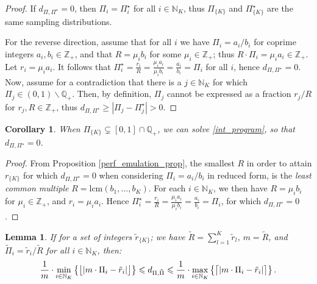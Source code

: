 \documentclass[journal,letterpaper,onecolumn,twoside,nofonttune]{IEEEtran}
\newcommand{\N}{\mathbb{N}}
\newcommand{\Z}{\mathbb{Z}}
\newcommand{\Q}{\mathbb{Q}}
\newcommand{\Rt}{\tilde{R}}
\newcommand{\rt}{\tilde{r}}
\newcommand{\Pis}{\Pi^{\star}}
\newcommand{\Pit}{\tilde{\Pi}}
\newcommand{\lcm}{\mathrm{lcm}}
\DeclarePairedDelimiter\bceil{\big\lceil}{\big\rceil}
\DeclarePairedDelimiter\bfloor{\big\lfloor}{\big\rfloor}
\newtheorem{Cor}{Corollary}
\newtheorem{Lemma}{Lemma}
\begin{document}
\begin{proof}
If $d_{\Pi,\Pis}=0$, then $\Pi_i=\Pis_i$ for all $i\in\N_K$, thus $\Pi_{\{K\}}$ and $\Pis_{\{K\}}$ are the same sampling distributions.

For the reverse direction, assume that for all $i$ we have $\Pi_i=a_i/b_i$ for coprime integers $a_i,b_i\in\Z_+$, and that $R=\mu_i b_i$ for some $\mu_i\in\Z_+$; thus $R\cdot\Pi_i=\mu_i a_i\in\Z_+$. Let $r_i=\mu_i a_i$. It follows that $\Pis_i=\frac{r_i}{R}=\frac{\mu_i a_i}{\mu_i b_i}=\frac{a_i}{b_i}=\Pi_i$ for all $i$, hence $d_{\Pi,\Pis}=0$. Now, assume for a contradiction that there is a $j\in\N_K$ for which $\Pi_j\in(0,1)\backslash\Q_+$. Then, by definition, $\Pi_j$ cannot be expressed as a fraction $r_j/R$ for $r_j,R\in\Z_+$, thus $d_{\Pi,\Pis}\geqslant|\Pi_j-\Pis_j|>0$.
\end{proof}

\begin{Cor}
\label{cor_exact_sol}
When $\Pi_{\{K\}}\subsetneq[0,1]\cap\Q_+$, we can solve \eqref{int_program}, so that $d_{\Pi,\Pis}=0$.
\end{Cor}

\begin{proof}
From Proposition \ref{perf_emulation_prop}, the smallest $R$ in order to attain $r_{\{K\}}$ for which $d_{\Pi,\Pis}=0$ when considering $\Pi_i=a_i/b_i$ in reduced form, is the \textit{least common multiple} $R=\lcm(b_1,\ldots,b_K)$. For each $i\in\N_K$, we then have $R=\mu_i b_i$ for $\mu_i\in\Z_+$, and $r_i=\mu_i a_i$. Hence $\Pis_i=\frac{r_i}{R}=\frac{\mu_i a_i}{\mu_i b_i}=\frac{a_i}{b_i}=\Pi_i$, for which $d_{\Pi,\Pis}=0$.
\end{proof}

\begin{Lemma}
If for a set of integers $\rt_{\{K\}}$; we have $\Rt=\sum_{l=1}^K\rt_l$, $m=\Rt$, and $\Pit_i=\rt_i/\Rt$ for all $i\in\N_K$, then:
\begin{equation}
\label{bds_distortion}
  \frac{1}{m}\cdot\min_{i\in\N_K}\left\{\bfloor{|m\cdot\Pi_i-\rt_i|}\right\} \leqslant d_{\Pi,\Pit} \leqslant \frac{1}{m}\cdot\max_{i\in\N_K}\left\{\bceil{|m\cdot\Pi_i-\rt_i|}\right\}.
\end{equation}
\end{Lemma}
\end{document}
